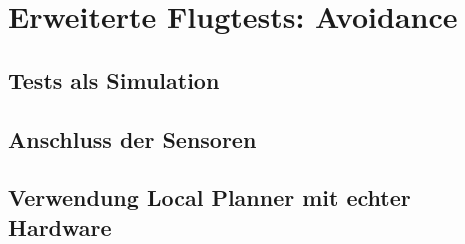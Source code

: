 \chapter{Erweiterte Flugtests: Avoidance}

\section{Tests als Simulation}

\section{Anschluss der Sensoren}

\section{Verwendung Local Planner mit echter Hardware}


